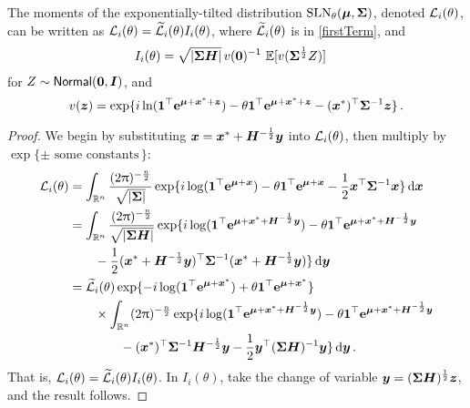 \begin{subappendices}
\begin{proposition} \label{prop:laplace_derivatives}
The moments of the exponentially-tilted distribution $\mathrm{SLN}_\theta(\bm{\mu}, \bm{\Sigma})$, denoted $\mathcal{L}_i(\theta)$, can be written as $\mathcal{L}_i(\theta) = \widetilde{\mathcal{L}}_i(\theta) I_i(\theta)$, where $\widetilde{\mathcal{L}}_i(\theta)$ is in \eqref{firstTerm}, and
\begin{align*}
	I_i(\theta) &= \sqrt{|\bm{\Sigma} \bm{H}|} \, v(\bm{0})^{-1} \, \operatorname{{\mathbb E}}[v(\bm{\Sigma}^{\frac12} Z)]
\end{align*}
for $Z \sim \mathsf{Normal}(\bm{0}, \bm{I})$, and
\[ v(\bm{z}) = \exp\{ i \ln(\bm{1}^\top \bm{\mathrm{e}}^{\bm{\mu} + \bm{x}^* + \bm{z}}) - \theta \bm{1}^\top \bm{\mathrm{e}}^{\bm{\mu} + \bm{x}^* + \bm{z}} - (\bm{x}^*)^\top \bm{\Sigma}^{-1} \bm{z} \} \,. \]
\end{proposition}
\begin{proof}
We begin by substituting $\bm{x} = \bm{x}^* + \bm{H}^{-\frac12} \bm{y}$ into $\mathcal{L}_i(\theta)$, then multiply by $\exp\{ \pm \text{ some constants}\,\}$:
\begin{align*}
	\Laplace_i(\theta) &= \int_{\RL^n} \frac{ (2\pi)^{-\frac{n}{2}} }{\sqrt{|\bfSigma|}} \exp\{ i \log(\bfone^\tr \ve^{\bfmu + \bfx}) - \theta \bfone^\tr \ve^{\bfmu + \bfx} - \frac12 \bfx^\tr \bfSigma^{-1} \bfx \}  \dif \bfx \\
	&= \int_{\RL^n} \frac{ (2\pi)^{-\frac{n}{2}} }{\sqrt{|\bfSigma \bfH|}} \exp\{ i \log(\bfone^\tr \ve^{\bfmu + \bfx^* + \bfH^{-\frac12} \bfy}) - \theta \bfone^\tr \ve^{\bfmu + \bfx^* + \bfH^{-\frac12} \bfy} \\
	&\qquad - \frac12 (\bfx^* + \bfH^{-\frac12} \bfy)^\tr \bfSigma^{-1} (\bfx^* + \bfH^{-\frac12} \bfy) \}  \dif \bfy \\
	&= \widetilde{\Laplace}_i(\theta) \exp\{ -i \log(\bfone^\tr \ve^{\bfmu + \bfx^*}) + \theta \bfone^\tr \ve^{\bfmu + \bfx^*} \} \\
	&\qquad \times \int_{\RL^n} (2\pi)^{-\frac{n}{2}} \exp\{ i \log(\bfone^\tr \ve^{\bfmu + \bfx^* + \bfH^{-\frac12} \bfy}) - \theta \bfone^\tr \ve^{\bfmu + \bfx^* + \bfH^{-\frac12} \bfy} \\
	&\qquad\qquad -(\bfx^*)^\tr \bfSigma^{-1} \bfH^{-\frac12} \bfy - \frac12 \bfy^\tr (\bfSigma \bfH)^{-1} \bfy \}  \dif \bfy \,.
\end{align*}
That is, $\mathcal{L}_i(\theta) = \widetilde{\mathcal{L}}_i(\theta) I_i(\theta)$. In $I_i(\theta)$, take the change of variable $\bm{y} = (\bm{\Sigma}\bm{H})^{\frac12} \bm{z}$, and the result follows.

\end{proof}
\end{subappendices}
